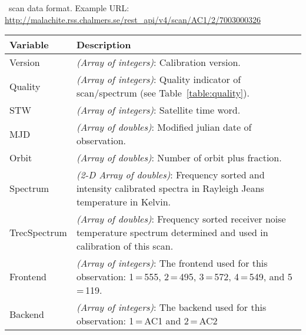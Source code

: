 \begin{table}
\caption{ \smr\ scan data format.
Example URL: \url{http://malachite.rss.chalmers.se/rest_api/v4/scan/AC1/2/7003000326}}
\label{table:dataformat}
\end{table}
\addtocounter{table}{-1}
\begin{longtable}{| p{} | p{} |} 
\hline
  \textbf{Variable} & \textbf{Description} \\
  \hline
     Version         & \emph{(Array of integers)}: Calibration version. \\ \hline
     Quality         & \emph{(Array of integers)}: Quality indicator of scan/spectrum (see Table~\ref{table:quality}). \\ \hline
     STW             & \emph{(Array of integers)}: Satellite time word.\\ \hline
     MJD             & \emph{(Array of doubles)}: Modified julian date of observation. \\ \hline
     Orbit           & \emph{(Array of doubles)}: Number of orbit plus fraction. \\ \hline
     Spectrum        & \emph{(2-D Array of doubles)}: Frequency sorted and intensity calibrated spectra
                       in Rayleigh Jeans temperature in Kelvin.\\ \hline
     TrecSpectrum    & \emph{(Array of doubles)}: Frequency sorted receiver noise temperature spectrum
                       determined and used in calibration of this scan. \\ \hline
     Frontend        & \emph{(Array of integers)}: The frontend used for this observation: 1\,=\,555, 2\,=\,495, 
                       3\,=\,572, 4\,=\,549, and 5\,=\,119.\\ \hline
     Backend         & \emph{(Array of integers)}: The backend used for this observation: 1\,=\,AC1 and 2\,=\,AC2\\ \hline

\end{longtable}
